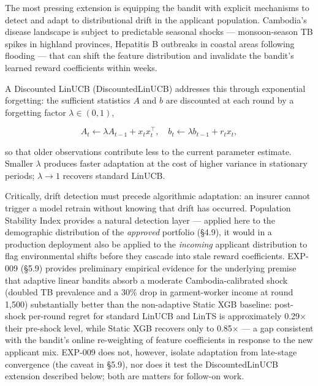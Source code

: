 The most pressing extension is equipping the bandit with explicit mechanisms to detect and adapt to distributional drift in the applicant population. Cambodia's disease landscape is subject to predictable seasonal shocks --- monsoon-season TB spikes in highland provinces, Hepatitis B outbreaks in coastal areas following flooding --- that can shift the feature distribution and invalidate the bandit's learned reward coefficients within weeks.

A Discounted LinUCB (DiscountedLinUCB) addresses this through exponential forgetting: the sufficient statistics \(A\) and \(b\) are discounted at each round by a forgetting factor \(\lambda \in (0, 1)\),

\[A_t \leftarrow \lambda A_{t-1} + x_t x_t^\top, \quad b_t \leftarrow \lambda b_{t-1} + r_t x_t,\]

so that older observations contribute less to the current parameter estimate. Smaller \(\lambda\) produces faster adaptation at the cost of higher variance in stationary periods; \(\lambda \to 1\) recovers standard LinUCB.

Critically, drift detection must precede algorithmic adaptation: an insurer cannot trigger a model retrain without knowing that drift has occurred. Population Stability Index provides a natural detection layer --- applied here to the demographic distribution of the \emph{approved} portfolio (§4.9), it would in a production deployment also be applied to the \emph{incoming} applicant distribution to flag environmental shifts before they cascade into stale reward coefficients. EXP-009 (§5.9) provides preliminary empirical evidence for the underlying premise that adaptive linear bandits absorb a moderate Cambodia-calibrated shock (doubled TB prevalence and a 30\% drop in garment-worker income at round 1,500) substantially better than the non-adaptive Static XGB baseline: post-shock per-round regret for standard LinUCB and LinTS is approximately 0.29× their pre-shock level, while Static XGB recovers only to 0.85× --- a gap consistent with the bandit's online re-weighting of feature coefficients in response to the new applicant mix. EXP-009 does not, however, isolate adaptation from late-stage convergence (the caveat in §5.9), nor does it test the DiscountedLinUCB extension described below; both are matters for follow-on work.

